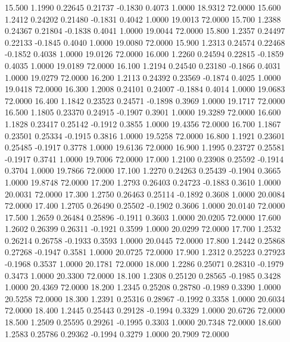   15.500   1.1990   0.22645   0.21737  -0.1830   0.4073   1.0000  18.9312  72.0000
  15.600   1.2412   0.24202   0.21480  -0.1831   0.4042   1.0000  19.0013  72.0000
  15.700   1.2388   0.24367   0.21804  -0.1838   0.4041   1.0000  19.0044  72.0000
  15.800   1.2357   0.24497   0.22133  -0.1845   0.4040   1.0000  19.0080  72.0000
  15.900   1.2313   0.24574   0.22468  -0.1852   0.4038   1.0000  19.0126  72.0000
  16.000   1.2260   0.24594   0.22815  -0.1859   0.4035   1.0000  19.0189  72.0000
  16.100   1.2194   0.24540   0.23180  -0.1866   0.4031   1.0000  19.0279  72.0000
  16.200   1.2113   0.24392   0.23569  -0.1874   0.4025   1.0000  19.0418  72.0000
  16.300   1.2008   0.24101   0.24007  -0.1884   0.4014   1.0000  19.0683  72.0000
  16.400   1.1842   0.23523   0.24571  -0.1898   0.3969   1.0000  19.1717  72.0000
  16.500   1.1805   0.23370   0.24915  -0.1907   0.3901   1.0000  19.3289  72.0000
  16.600   1.1828   0.23417   0.25142  -0.1912   0.3855   1.0000  19.4356  72.0000
  16.700   1.1867   0.23501   0.25334  -0.1915   0.3816   1.0000  19.5258  72.0000
  16.800   1.1921   0.23601   0.25485  -0.1917   0.3778   1.0000  19.6136  72.0000
  16.900   1.1995   0.23727   0.25581  -0.1917   0.3741   1.0000  19.7006  72.0000
  17.000   1.2100   0.23908   0.25592  -0.1914   0.3704   1.0000  19.7866  72.0000
  17.100   1.2270   0.24263   0.25439  -0.1904   0.3665   1.0000  19.8748  72.0000
  17.200   1.2793   0.26403   0.24723  -0.1883   0.3610   1.0000  20.0031  72.0000
  17.300   1.2750   0.26463   0.25114  -0.1892   0.3608   1.0000  20.0084  72.0000
  17.400   1.2705   0.26490   0.25502  -0.1902   0.3606   1.0000  20.0140  72.0000
  17.500   1.2659   0.26484   0.25896  -0.1911   0.3603   1.0000  20.0205  72.0000
  17.600   1.2602   0.26399   0.26311  -0.1921   0.3599   1.0000  20.0299  72.0000
  17.700   1.2532   0.26214   0.26758  -0.1933   0.3593   1.0000  20.0445  72.0000
  17.800   1.2442   0.25868   0.27268  -0.1947   0.3581   1.0000  20.0725  72.0000
  17.900   1.2312   0.25223   0.27923  -0.1968   0.3537   1.0000  20.1781  72.0000
  18.000   1.2286   0.25071   0.28310  -0.1979   0.3473   1.0000  20.3300  72.0000
  18.100   1.2308   0.25120   0.28565  -0.1985   0.3428   1.0000  20.4369  72.0000
  18.200   1.2345   0.25208   0.28780  -0.1989   0.3390   1.0000  20.5258  72.0000
  18.300   1.2391   0.25316   0.28967  -0.1992   0.3358   1.0000  20.6034  72.0000
  18.400   1.2445   0.25443   0.29128  -0.1994   0.3329   1.0000  20.6726  72.0000
  18.500   1.2509   0.25595   0.29261  -0.1995   0.3303   1.0000  20.7348  72.0000
  18.600   1.2583   0.25786   0.29362  -0.1994   0.3279   1.0000  20.7909  72.0000
